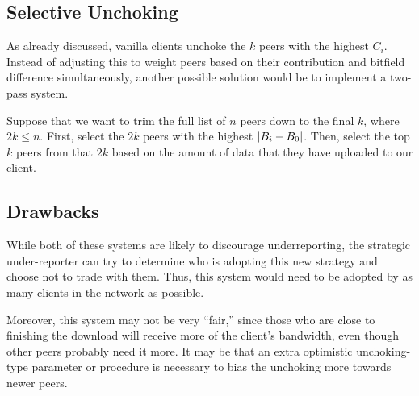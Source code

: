 \subsection{Selective Unchoking}

As already discussed, vanilla clients unchoke the $k$ peers with the highest $C_i$. Instead of adjusting this to weight peers based on their contribution and bitfield difference simultaneously, another possible solution would be to implement a two-pass system.

Suppose that we want to trim the full list of $n$ peers down to the final $k$, where $2k \leq n$. First, select the $2k$ peers with the highest $\lvert B_i - B_0\rvert$. Then, select the top $k$ peers from that $2k$ based on the amount of data that they have uploaded to our client.

\subsection{Drawbacks}
While both of these systems are likely to discourage underreporting, the strategic under-reporter can try to determine who is adopting this new strategy and choose not to trade with them. Thus, this system would need to be adopted by as many clients in the network as possible.

Moreover, this system may not be very ``fair,'' since those who are close to finishing the download will receive more of the client's bandwidth, even though other peers probably need it more. It may be that an extra optimistic unchoking-type parameter or procedure is necessary to bias the unchoking more towards newer peers.
